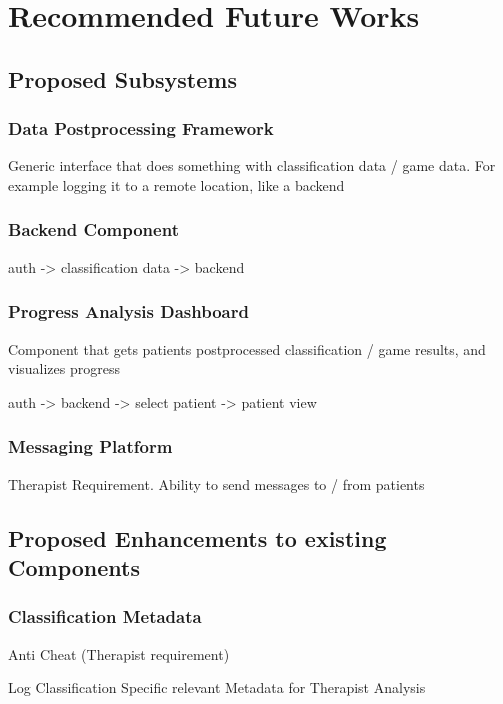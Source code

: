 \chapter{Recommended Future Works}
\label{sec:future}
\section{Proposed Subsystems}
\subsection{Data Postprocessing Framework}
Generic interface that does something with classification data / game data. For example logging it to a remote location, like a backend

\subsection{Backend Component}

auth -> classification data -> backend
\subsection{Progress Analysis Dashboard}
Component that gets patients postprocessed classification / game results, and visualizes progress

auth -> backend -> select patient -> patient view
\subsection{Messaging Platform}
Therapist Requirement. Ability to send messages to / from patients
\section{Proposed Enhancements to existing Components}
\subsection{Classification Metadata}
Anti Cheat (Therapist requirement)

Log Classification Specific relevant Metadata for Therapist Analysis

